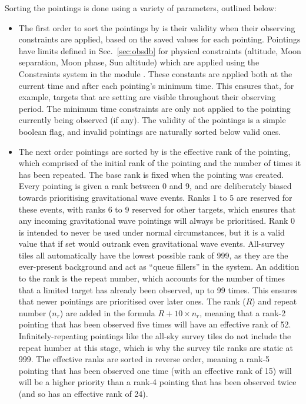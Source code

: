 \begin{colsection}
\begin{colsection}
Sorting the pointings is done using a variety of parameters, outlined below:

\begin{itemize}
\item The first order to sort the pointings by is their validity when their observing constraints are applied, based on the saved values for each pointing. Pointings have limits defined in Sec.~\ref{sec:obsdb} for physical constraints (altitude, Moon separation, Moon phase, Sun altitude) which are applied using the Constraints system in the   module \citep{astroplan}. These constants are applied both at the current time and after each pointing's minimum time. This ensures that, for example, targets that are setting are visible throughout their observing period. The minimum time constraints are only not applied to the pointing currently being observed (if any). The validity of the pointings is a simple boolean flag, and invalid pointings are naturally sorted below valid ones.

\item The next order pointings are sorted by is the effective rank of the pointing, which comprised of the initial rank of the pointing and the number of times it has been repeated. The base rank is fixed when the pointing was created. Every pointing is given a rank between 0 and 9, and are deliberately biased towards prioritising gravitational wave events. Ranks 1 to 5 are reserved for these events, with ranks 6 to 9 reserved for other targets, which ensures that any incoming gravitational wave pointings will always be prioritised. Rank 0 is intended to never be used under normal circumstances, but it is a valid value that if set would outrank even gravitational wave events. All-survey tiles all automatically have the lowest possible rank of 999, as they are the ever-present background and act as ``queue fillers'' in the system. An addition to the rank is the repeat number, which accounts for the number of times that a limited target has already been observed, up to 99 times. This ensures that newer pointings are prioritised over later ones. The rank ($R$) and repeat number ($n_r$) are added in the formula $R + 10\times n_r$, meaning that a rank-2 pointing that has been observed five times will have an effective rank of 52. Infinitely-repeating pointings like the all-sky survey tiles do not include the repeat humber at this stage, which is why the survey tile ranks are static at 999. The effective ranks are sorted in reverse order, meaning a rank-5 pointing that has been observed one time (with an effective rank of 15) will will be a higher priority than a rank-4 pointing that has been observed twice (and so has an effective rank of 24).


\end{itemize}
\end{colsection}
\end{colsection}
